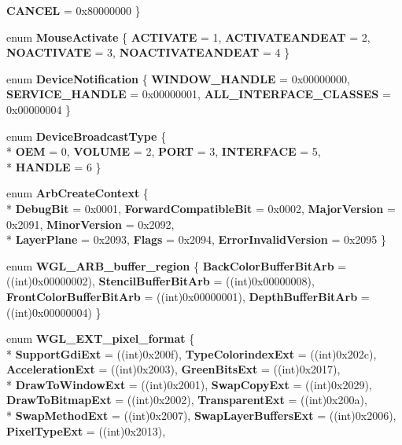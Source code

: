 \begin{DoxyCompactItemize}
{\bfseries C\-A\-N\-C\-E\-L} = 0x80000000
 \}
\item 
enum {\bfseries Mouse\-Activate} \{ {\bfseries A\-C\-T\-I\-V\-A\-T\-E} = 1, 
{\bfseries A\-C\-T\-I\-V\-A\-T\-E\-A\-N\-D\-E\-A\-T} = 2, 
{\bfseries N\-O\-A\-C\-T\-I\-V\-A\-T\-E} = 3, 
{\bfseries N\-O\-A\-C\-T\-I\-V\-A\-T\-E\-A\-N\-D\-E\-A\-T} = 4
 \}
\item 
enum {\bfseries Device\-Notification} \{ {\bfseries W\-I\-N\-D\-O\-W\-\_\-\-H\-A\-N\-D\-L\-E} = 0x00000000, 
{\bfseries S\-E\-R\-V\-I\-C\-E\-\_\-\-H\-A\-N\-D\-L\-E} = 0x00000001, 
{\bfseries A\-L\-L\-\_\-\-I\-N\-T\-E\-R\-F\-A\-C\-E\-\_\-\-C\-L\-A\-S\-S\-E\-S} = 0x00000004
 \}
\item 
enum {\bfseries Device\-Broadcast\-Type} \{ \\*
{\bfseries O\-E\-M} = 0, 
{\bfseries V\-O\-L\-U\-M\-E} = 2, 
{\bfseries P\-O\-R\-T} = 3, 
{\bfseries I\-N\-T\-E\-R\-F\-A\-C\-E} = 5, 
\\*
{\bfseries H\-A\-N\-D\-L\-E} = 6
 \}
\item 
enum {\bfseries Arb\-Create\-Context} \{ \\*
{\bfseries Debug\-Bit} = 0x0001, 
{\bfseries Forward\-Compatible\-Bit} = 0x0002, 
{\bfseries Major\-Version} = 0x2091, 
{\bfseries Minor\-Version} = 0x2092, 
\\*
{\bfseries Layer\-Plane} = 0x2093, 
{\bfseries Flags} = 0x2094, 
{\bfseries Error\-Invalid\-Version} = 0x2095
 \}
\item 
enum {\bfseries W\-G\-L\-\_\-\-A\-R\-B\-\_\-buffer\-\_\-region} \{ {\bfseries Back\-Color\-Buffer\-Bit\-Arb} = ((int)0x00000002), 
{\bfseries Stencil\-Buffer\-Bit\-Arb} = ((int)0x00000008), 
{\bfseries Front\-Color\-Buffer\-Bit\-Arb} = ((int)0x00000001), 
{\bfseries Depth\-Buffer\-Bit\-Arb} = ((int)0x00000004)
 \}
\item 
enum {\bfseries W\-G\-L\-\_\-\-E\-X\-T\-\_\-pixel\-\_\-format} \{ \\*
{\bfseries Support\-Gdi\-Ext} = ((int)0x200f), 
{\bfseries Type\-Colorindex\-Ext} = ((int)0x202c), 
{\bfseries Acceleration\-Ext} = ((int)0x2003), 
{\bfseries Green\-Bits\-Ext} = ((int)0x2017), 
\\*
{\bfseries Draw\-To\-Window\-Ext} = ((int)0x2001), 
{\bfseries Swap\-Copy\-Ext} = ((int)0x2029), 
{\bfseries Draw\-To\-Bitmap\-Ext} = ((int)0x2002), 
{\bfseries Transparent\-Ext} = ((int)0x200a), 
\\*
{\bfseries Swap\-Method\-Ext} = ((int)0x2007), 
{\bfseries Swap\-Layer\-Buffers\-Ext} = ((int)0x2006), 
{\bfseries Pixel\-Type\-Ext} = ((int)0x2013), 

\end{DoxyCompactItemize}
